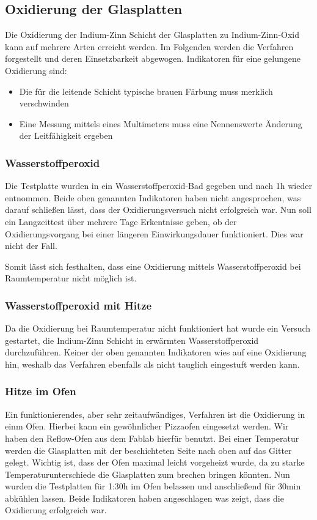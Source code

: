 \subsection{Oxidierung der Glasplatten}

Die Oxidierung der Indium-Zinn Schicht der Glasplatten zu Indium-Zinn-Oxid kann auf mehrere Arten erreicht werden. Im Folgenden werden die Verfahren forgestellt und deren Einsetzbarkeit abgewogen.
Indikatoren für eine gelungene Oxidierung sind:
\begin{itemize}
\item Die für die leitende Schicht typische brauen Färbung muss merklich verschwinden
\item Eine Messung mittels eines Multimeters muss eine Nennenswerte Änderung der Leitfähigkeit ergeben
\end{itemize}

\subsubsection{Wasserstoffperoxid}

Die Testplatte wurden in ein Wasserstoffperoxid-Bad gegeben und nach 1h wieder entnommen. Beide oben genannten Indikatoren haben nicht angesprochen, was darauf schließen lässt, dass der Oxidierungsversuch nicht erfolgreich war.
Nun soll ein Langzeittest über mehrere Tage Erkentnisse geben, ob der Oxidierungsvorgang bei einer längeren Einwirkungsdauer funktioniert. Dies war nicht der Fall.

Somit lässt sich festhalten, dass eine Oxidierung mittels Wasserstoffperoxid bei Raumtemperatur nicht möglich ist.

\subsubsection{Wasserstoffperoxid mit Hitze}

Da die Oxidierung bei Raumtemperatur nicht funktioniert hat wurde ein Versuch gestartet, die Indium-Zinn Schicht in erwärmten Wasserstoffperoxid durchzuführen.
Keiner der oben genannten Indikatoren wies auf eine Oxidierung hin, weshalb das Verfahren ebenfalls als nicht tauglich eingestuft werden kann.

\subsubsection{Hitze im Ofen}

Ein funktionierendes, aber sehr zeitaufwändiges, Verfahren ist die Oxidierung in einm Ofen. Hierbei kann ein gewöhnlicher Pizzaofen eingesetzt werden. Wir haben den Reflow-Ofen aus dem Fablab hierfür benutzt.
Bei einer Temperatur werden die Glasplatten mit der beschichteten Seite nach oben auf das Gitter gelegt. Wichtig ist, dass der Ofen maximal leicht vorgeheizt wurde, da zu starke Temperaturunterschiede die Glasplatten zum brechen bringen könnten. Nun wurden die Testplatten für 1:30h im Ofen belassen und anschließend für 30min abkühlen lassen.
Beide Indikatoren haben angeschlagen was zeigt, dass die Oxidierung erfolgreich war.

